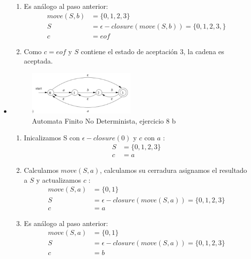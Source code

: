 \begin{itemize}
\begin{enumerate}
        \item Es análogo al paso anterior:
        \begin{align*}
            move(S, b) &= \{0, 1, 2, 3\} \\
            S &= \epsilon-closure (move(S, b)) = \{0, 1, 2, 3, \} \\
            c &= eof
        \end{align*}
        \item Como $c = eof$ y $S$ contiene el estado de aceptación $3$, la cadena es aceptada.
    \end{enumerate}
    \newpage
    \item
    \begin{figure}[h!]
        \centering
        \includegraphics[width=0.5\textwidth]{images/8b.png}
        \caption{Automata Finito No Determinista, ejercicio 8 b}
    \end{figure}
    \begin{enumerate}
        \item Inicalizamos S con $\epsilon - closure (0)$ y $c$ con $a$ :
        \begin{align*}
            S &= \{0, 1, 2, 3\} \\
            c &= a
        \end{align*} 
        \item Calculamos $move(S, a)$, calculamos su cerradura asignamos el resultado a $S$ y actualizamos $c$ :
        \begin{align*}
            move(S, a) &= \{0, 1\} \\
            S &= \epsilon-closure (move(S, a)) = \{0, 1, 2, 3\} \\
            c &= a
        \end{align*}
        \item Es análogo al paso anterior:
        \begin{align*}
            move(S, a) &= \{0, 1\} \\
            S &= \epsilon-closure (move(S, a)) = \{0, 1, 2, 3\} \\
            c &= b
        \end{align*}

\end{enumerate}
\end{itemize}

